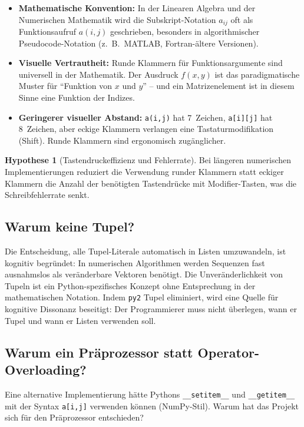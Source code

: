 ﻿\documentclass[a4paper,12pt]{article}
\theoremstyle{definition}
\newtheorem{hypothese}{Hypothese}
\begin{document}
\begin{itemize}
	\item \textbf{Mathematische Konvention:} In der Linearen Algebra und der Numerischen
	      Mathematik wird die Subskript-Notation $a_{ij}$ oft als Funktionsaufruf $a(i,j)$
	      geschrieben, besonders in algorithmischer Pseudocode-Notation (z.\ B.\ MATLAB,
	      Fortran-\"altere Versionen).
	\item \textbf{Visuelle Vertrautheit:} Runde Klammern f\"ur Funktionsargumente sind
	      universell in der Mathematik. Der Ausdruck $f(x, y)$ ist das paradigmatische
	      Muster f\"ur ``Funktion von $x$ und $y$'' -- und ein Matrizenelement ist
	      in diesem Sinne eine Funktion der Indizes.
	\item \textbf{Geringerer visueller Abstand:} \texttt{a(i,j)} hat 7~Zeichen,
	      \texttt{a[i][j]} hat 8~Zeichen, aber eckige Klammern verlangen eine
	      Tastaturmodifikation (Shift). Runde Klammern sind ergonomisch zug\"anglicher.
\end{itemize}

\begin{hypothese}[Tastendruckeffizienz und Fehlerrate]
	Bei l\"angeren numerischen Implementierungen reduziert die Verwendung runder
	Klammern statt eckiger Klammern die Anzahl der ben\"otigten Tastendr\"ucke
	mit Modifier-Tasten, was die Schreibfehlerrate senkt.
\end{hypothese}

\subsection{Warum keine Tupel?}

Die Entscheidung, alle Tupel-Literale automatisch in Listen umzuwandeln, ist kognitiv
begr\"undet: In numerischen Algorithmen werden Sequenzen fast ausnahmslos als
ver\"anderbare Vektoren ben\"otigt. Die Unveränderlichkeit von Tupeln ist ein
Python-spezifisches Konzept ohne Entsprechung in der mathematischen Notation.
Indem \texttt{py2} Tupel eliminiert, wird eine Quelle f\"ur kognitive Dissonanz
beseitigt: Der Programmierer muss nicht \"uberlegen, wann er Tupel und wann er
Listen verwenden soll.

\subsection{Warum ein Pr\"aprozessor statt Operator-Overloading?}

Eine alternative Implementierung h\"atte Pythons \texttt{\_\_setitem\_\_} und
\texttt{\_\_getitem\_\_} mit der Syntax \texttt{a[i,j]} verwenden k\"onnen
(NumPy-Stil). Warum hat das Projekt sich f\"ur den Pr\"aprozessor entschieden?
\end{document}
